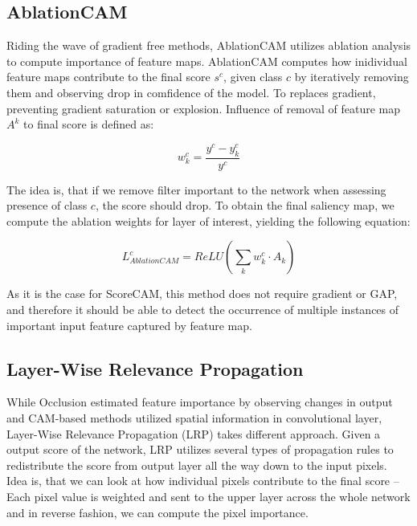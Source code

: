 
\subsection{AblationCAM}


Riding the wave of gradient free methods, AblationCAM utilizes ablation analysis to compute importance of feature maps. AblationCAM computes how inidividual feature maps contribute to the final score $s^c$, given class $c$ by iteratively removing them and observing drop in comfidence of the model. To replaces gradient, preventing gradient saturation or explosion. Influence of removal of feature map $A^k$ to final score is defined as:

\begin{equation}
    w^c_k = \frac{y^c - y^c_k}{y^c}
\end{equation}

The idea is, that if we remove filter important to the network when assessing presence of class $c$, the score should drop. To obtain the final saliency map, we compute the ablation weights for layer of interest, yielding the following equation:

\begin{equation}
    L^c_{AblationCAM} = ReLU(\sum_k w^c_k \cdot A_k)
\end{equation}

As it is the case for ScoreCAM, this method does not require gradient or GAP, and therefore it should be able to detect the occurrence of multiple instances of important input feature captured by feature map.

\subsection{Layer-Wise Relevance Propagation}

While Occlusion estimated feature importance by observing changes in output and CAM-based methods utilized spatial information in convolutional layer, Layer-Wise Relevance Propagation (LRP) takes different approach. Given a output score of the network, LRP utilizes several types of propagation rules to redistribute the score from output layer all the way down to the input pixels. Idea is, that we can look at how individual pixels contribute to the final score -- Each pixel value is weighted and sent to the upper layer across the whole network and in reverse fashion, we can compute the pixel importance.


